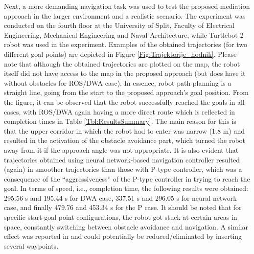 Next, a more demanding navigation task was used to test the proposed mediation approach in the larger environment and a realistic scenario. The experiment was conducted on the fourth floor at the University of Split, Faculty of Electrical Engineering, Mechanical Engineering and Naval Architecture, while Turtlebot 2 robot was used in the experiment. Examples of the obtained trajectories (for two different goal points) are depicted in Figure \ref{Fig:Trajektorije_hodnik}. Please note that although the obtained trajectories are plotted on the map, the robot itself did not have access to the map in the proposed approach (but does have it without obstacles for ROS/DWA case). In essence, robot path planning is a straight line, going from the start to the proposed approach's goal position. From the figure, it can be observed that the robot successfully reached the goals in all cases, with ROS/DWA again having a more direct route which is reflected in completion times in Table \ref{Tbl:ResultsSummary}. The main reason for this is that the upper corridor in which the robot had to enter was narrow (1.8 m) and resulted in the activation of the obstacle avoidance part, which turned the robot away from it if the approach angle was not appropriate. It is also evident that trajectories obtained using neural network-based navigation controller resulted (again) in smoother trajectories than those with P-type controller, which was a consequence of the ``aggressiveness'' of the P-type controller in trying to reach the goal. In terms of speed, i.e., completion time, the following results were obtained: 295.56 s and 195.44 s for DWA case, 337.51 s and 296.05 s for neural network case, and finally 479.76 and 453.34 s for the P case. It should be noted that for specific start-goal point configurations, the robot got stuck at certain areas in space, constantly switching between obstacle avoidance and navigation. A similar effect was reported in \cite{Pfeiffer2017} and could potentially be reduced/eliminated by inserting several waypoints.

